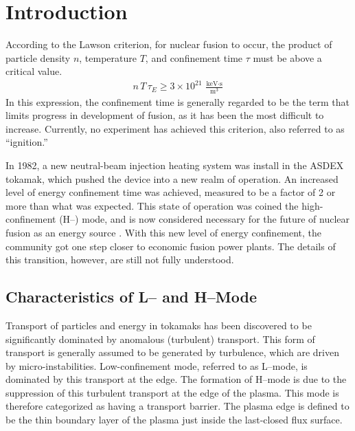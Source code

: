 \chapter{Introduction}\label{chapter:introduction}
According to the Lawson criterion, for nuclear fusion to occur, the product of particle density $n$, temperature $T$, and confinement time $\tau$ must be above a critical value.
\begin{align} %
	n\,T\,\tau_E \geq 3\times 10^{21}~\frac{\text{keV}\cdot\text{s}}{\text{m}^3}
\end{align}
In this expression, the confinement time is generally regarded to be the term that limits progress in development of fusion, as it has been the most difficult to increase.
Currently, no experiment has achieved this criterion, also referred to as ``ignition.''

In 1982, a new neutral-beam injection heating system was install in the ASDEX tokamak, which pushed the device into a new realm of operation.
An increased level of energy confinement time was achieved, measured to be a factor of 2 or more than what was expected.
This state of operation was coined the high-confinement (H--) mode, and is now considered necessary for the future of nuclear fusion as an energy source \cite{arnoux_how_2009, wagner_development_1984}.
With this new level of energy confinement, the community got one step closer to economic fusion power plants.
The details of this transition, however, are still not fully understood.

\section{Characteristics of L-- and H--Mode}\label{sec:characteristics}
Transport of particles and energy in tokamaks has been discovered to be significantly dominated by anomalous (turbulent) transport.
This form of transport is generally assumed to be generated by turbulence, which are driven by micro-instabilities.
Low-confinement mode, referred to as L--mode, is dominated by this transport at the edge.
The formation of H--mode is due to the suppression of this turbulent transport at the edge of the plasma.
This mode is therefore categorized as having a transport barrier.
The plasma edge is defined to be the thin boundary layer of the plasma just inside the last-closed flux surface.

